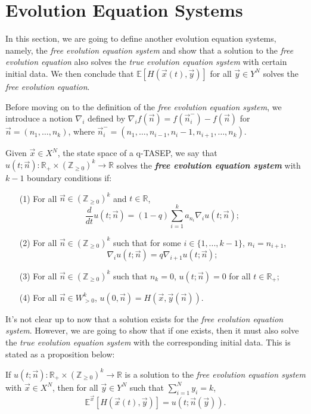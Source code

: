\section{Evolution Equation Systems}
\label{evolution-equation-system}
In this section, we are going to define another evolution equation systems, namely, the \emph{free evolution equation system} and show that a solution to the \emph{free evolution equation} also solves the \emph{true evolution equation system} with certain initial data. We then conclude that $\mathbb{E}[H(\vec{x}(t),\vec{y})]$ for all $\vec{y} \in Y^N$ solves the \emph{free evolution equation}.

Before moving on to the definition of the \emph{free evolution equation system}, we introduce a notion $\nabla_i$ defined by $\nabla_i f(\vec{n}) = f(\vec{n}_i^-) - f(\vec{n})$ for $\vec{n} = (n_1, \dots, n_k)$, where $\vec{n}_i^- = (n_1,\dots,n_{i-1}, n_i - 1, n_{i+1}, \dots, n_k)$.

\begin{definition}
\label{def:free-evolution-equation}
Given $\vec{x} \in X^N$, the state space of a q-TASEP, we say that $u(t;\vec{n}):\mathbb{R}_+ \times (\mathbb{Z}_{\ge 0})^k \rightarrow \mathbb{R}$ solves the \textbf{\emph{free evolution equation system}} with $k-1$ boundary conditions if:
\begin{enumerate}
\item[(1)] For all $\vec{n} \in (\mathbb{Z}_{\ge 0})^k$ and $t \in \mathbb{R}$, $$\frac{d}{dt} u(t;\vec{n}) = (1-q) \sum_{i=1}^{k} a_{n_i} \nabla_i u(t;\vec{n});$$
\item[(2)] For all $\vec{n} \in (\mathbb{Z}_{\ge 0})^k$ such that for some $i \in \{1,...,k-1\}$, $n_i = n_{i+1}$, $$\nabla_i u(t;\vec{n}) = q \nabla_{i+1} u(t;\vec{n});$$
\item[(3)] For all $\vec{n} \in (\mathbb{Z}_{\ge 0})^k$ such that $n_k = 0$, $u(t;\vec{n}) = 0$ for all $t \in \mathbb{R}_+$;
\item[(4)] For all $\vec{n} \in W^k_{>0}$, $u(0,\vec{n}) = H(\vec{x},\vec{y}(\vec{n}))$. 
\end{enumerate}
\end{definition}

It's not clear up to now that a solution exists for the \emph{free evolution equation system}. However, we are going to show that if one exists, then it must also solve the \emph{true evolution equation system} with the corresponding initial data. This is stated as a proposition below:

\begin{proposition}
If $u(t;\vec{n}):\mathbb{R}_+ \times (\mathbb{Z}_{\ge 0})^k \rightarrow \mathbb{R}$ is a solution to the \emph{free evolution equation system} with $\vec{x} \in X^N$, then for all $\vec{y} \in Y^N$ such that $\sum_{i=1}^{N} y_i = k$, $$\mathbb{E}^{\vec{x}}[H(\vec{x}(t), \vec{y})] = u(t;\vec{n}(\vec{y})).$$
\end{proposition}

